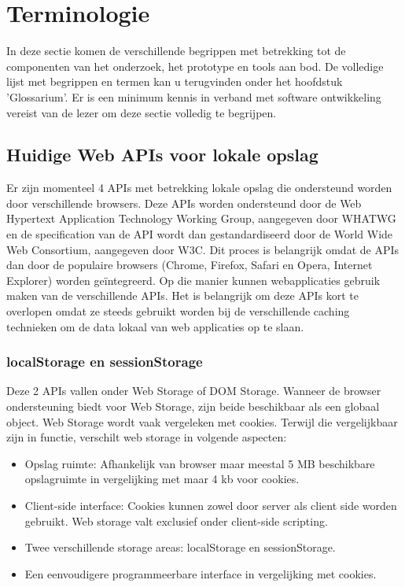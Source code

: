 \section{Terminologie}
\label{sec:terminologie}
In deze sectie komen de verschillende begrippen met betrekking tot de componenten van het onderzoek, het prototype en tools aan bod. De volledige lijst met begrippen en termen kan u terugvinden onder het hoofdstuk 'Glossarium'. Er is een minimum kennis in verband met software ontwikkeling vereist van de lezer om deze sectie volledig te begrijpen.
\subsection{Huidige Web APIs voor lokale opslag}
Er zijn momenteel 4 APIs met betrekking lokale opslag die ondersteund worden door verschillende browsers. Deze APIs worden ondersteund door de Web Hypertext Application Technology Working Group, aangegeven door WHATWG en de specification van de API wordt dan gestandardiseerd door de World Wide Web Consortium, aangegeven door W3C. Dit proces is belangrijk omdat de APIs dan door de populaire browsers (Chrome, Firefox, Safari en Opera, Internet Explorer) worden ge\"integreerd. Op die manier kunnen webapplicaties gebruik maken van de verschillende APIs. Het is belangrijk om deze APIs kort te overlopen omdat ze steeds gebruikt worden bij de verschillende caching technieken om de data lokaal van web applicaties op te slaan.
\subsubsection{localStorage en sessionStorage}
Deze 2 APIs vallen onder Web Storage of DOM Storage. Wanneer de browser ondersteuning biedt voor Web Storage, zijn beide beschikbaar als een globaal object. Web Storage wordt vaak vergeleken met cookies. Terwijl die vergelijkbaar zijn in functie, verschilt web storage in volgende aspecten: 
\begin{itemize}  
\item Opslag ruimte: Afhankelijk van browser maar meestal 5 MB beschikbare opslagruimte in vergelijking met maar 4 kb voor cookies.
\item Client-side interface: Cookies kunnen zowel door server als client side worden gebruikt. Web storage valt exclusief onder client-side scripting.
\item Twee verschillende storage areas: localStorage en sessionStorage.
\item Een eenvoudigere programmeerbare interface in vergelijking met cookies.
\end{itemize}
